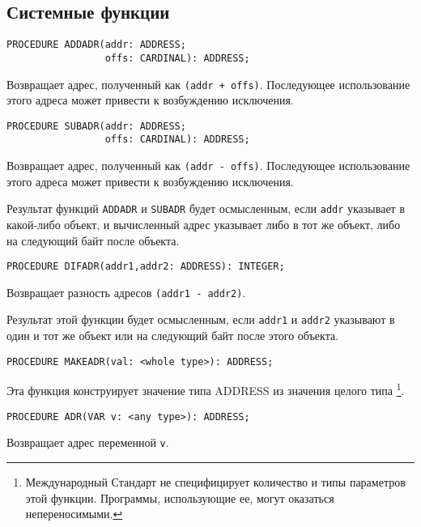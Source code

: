 \subsection{Системные функции}\label{addr:arithmetic}


\begin{verbatim}
PROCEDURE ADDADR(addr: ADDRESS;
                 offs: CARDINAL): ADDRESS;
\end{verbatim}
Возвращает адрес, полученный как {\tt (addr + offs)}.
Последующее использование этого адреса может привести к возбуждению
исключения.

\begin{verbatim}
PROCEDURE SUBADR(addr: ADDRESS;
                 offs: CARDINAL): ADDRESS;
\end{verbatim}
Возвращает адрес, полученный как {\tt (addr - offs)}.
Последующее использование этого адреса может привести к возбуждению
исключения.

\ifgenc
Результат функций {\tt ADDADR} и {\tt SUBADR} будет осмысленным,
если {\tt addr} указывает в какой-либо объект, и вычисленный адрес
указывает либо в тот же объект, либо на следующий байт после объекта.
\fi

\begin{verbatim}
PROCEDURE DIFADR(addr1,addr2: ADDRESS): INTEGER;
\end{verbatim}
Возвращает разность адресов {\tt (addr1 - addr2)}.

\ifgenc
Результат этой функции будет осмысленным, если
\verb|addr1| и \verb|addr2| указывают в один и тот же объект
или на следующий байт после этого объекта.
\fi

\begin{verbatim}
PROCEDURE MAKEADR(val: <whole type>): ADDRESS;
\end{verbatim}

Эта функция конструирует значение типа ADDRESS 
из значения целого типа \footnote{Международный Стандарт
не специфицирует количество и типы параметров этой функции.
Программы, использующие ее, могут оказаться непереносимыми.}.

\begin{verbatim}
PROCEDURE ADR(VAR v: <any type>): ADDRESS;
\end{verbatim}

Возвращает адрес переменной {\tt v}.

